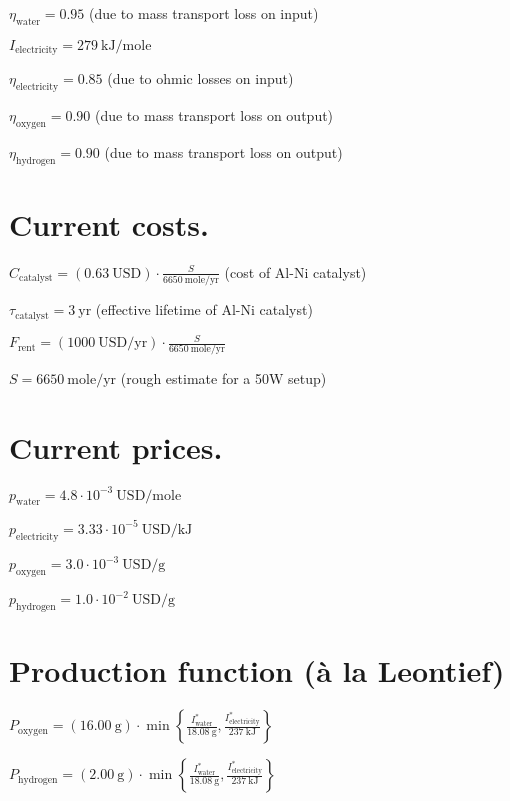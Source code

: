 \documentclass[letterpaper,10pt,english]{sphinxmanual}
\begin{document}
\(\eta_\mathrm{water} = 0.95\) (due to mass transport loss on input)

\(I_\mathrm{electricity} = 279~\mathrm{kJ/mole}\)

\(\eta_\mathrm{electricity} = 0.85\) (due to ohmic losses on input)

\(\eta_\mathrm{oxygen} = 0.90\) (due to mass transport loss on
output)

\(\eta_\mathrm{hydrogen} = 0.90\) (due to mass transport loss on
output)


\section{Current costs.}
\label{\detokenize{doc-src/example-electrolysis:current-costs}}
\(C_\mathrm{catalyst} = \left( 0.63~\mathrm{USD} \right) \cdot \frac{S}{6650~\mathrm{mole/yr}}\)
(cost of Al-Ni catalyst)

\(\tau_\mathrm{catalyst} = 3~\mathrm{yr}\) (effective lifetime of
Al-Ni catalyst)

\(F_\mathrm{rent} = \left( 1000~\mathrm{USD/yr} \right) \cdot \frac{S}{6650~\mathrm{mole/yr}}\)

\(S = 6650~\mathrm{mole/yr}\) (rough estimate for a 50W setup)


\section{Current prices.}
\label{\detokenize{doc-src/example-electrolysis:current-prices}}
\(p_\mathrm{water} = 4.8 \cdot 10^{-3}~\mathrm{USD/mole}\)

\(p_\mathrm{electricity} = 3.33 \cdot 10^{-5}~\mathrm{USD/kJ}\)

\(p_\mathrm{oxygen} = 3.0 \cdot 10^{-3}~\mathrm{USD/g}\)

\(p_\mathrm{hydrogen} = 1.0 \cdot 10^{-2}~\mathrm{USD/g}\)


\section{Production function (à la Leontief)}
\label{\detokenize{doc-src/example-electrolysis:production-function-a-la-leontief}}
\(P_\mathrm{oxygen} = \left( 16.00~\mathrm{g} \right) \cdot \min \left\{ \frac{I^*_\mathrm{water}}{18.08~\mathrm{g}}, \frac{I^*_\mathrm{electricity}}{237~\mathrm{kJ}} \right\}\)

\(P_\mathrm{hydrogen} = \left( 2.00~\mathrm{g} \right) \cdot \min \left\{ \frac{I^*_\mathrm{water}}{18.08~\mathrm{g}}, \frac{I^*_\mathrm{electricity}}{237~\mathrm{kJ}} \right\}\)
\end{document}
